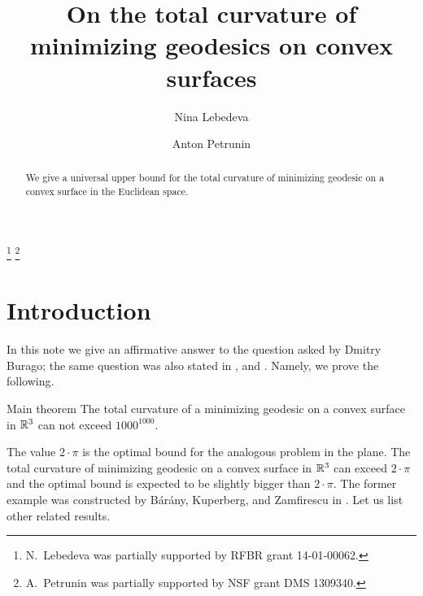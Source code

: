 \documentclass[a4paper,10pt]{amsart}
\begin{document}
\title{On the total curvature of \\
minimizing geodesics on convex surfaces}
\author{Nina Lebedeva}
\address{N. Lebedeva\newline\vskip-4mm
Math. Dept.
St. Petersburg State University,
Universitetsky pr., 28, 
Stary Peterhof, 
198504, Russia.
\newline\vskip-4mm
Steklov Institute,
27 Fontanka, St. Petersburg, 
191023, Russia.}
\author{Anton Petrunin}
\address{A. Petrunin\newline\vskip-4mm
Math. Dept. PSU,
University Park, PA 16802,
USA}
\thanks{N.~Lebedeva was partially supported by RFBR grant 
14-01-00062.}
\thanks{A.~Petrunin was partially supported by NSF grant DMS 1309340.}


\date{}

\begin{abstract}
We give a universal upper bound 
for the total curvature 
of minimizing geodesic 
on a convex surface 
in the Euclidean space.
\end{abstract}
\maketitle

\section{Introduction}






In this note we give an affirmative answer to the question asked by Dmitry Burago; 
the same question was also stated in \cite{AH-PSV}, \cite{pach} and \cite{BKZ}.
Namely, we prove the following.

\begin{thm}{Main theorem}\label{thm:main}
The total curvature of a minimizing geodesic
on a convex surface in $\mathbb{R}^3$ can not exceed $1000^{1000}$.
\end{thm}

The value $2\cdot\pi$ is the optimal bound for the analogous problem in the plane.
The total curvature
of minimizing geodesic on a convex surface in $\mathbb{R}^3$
can exceed $2\cdot\pi$
and the optimal bound 
is expected to be slightly bigger than $2\cdot\pi$.
The former example was constructed by B{\'a}r{\'a}ny,
Kuperberg, 
and Zamfirescu in \cite{BKZ}.
Let us list other related results.
\end{document}

